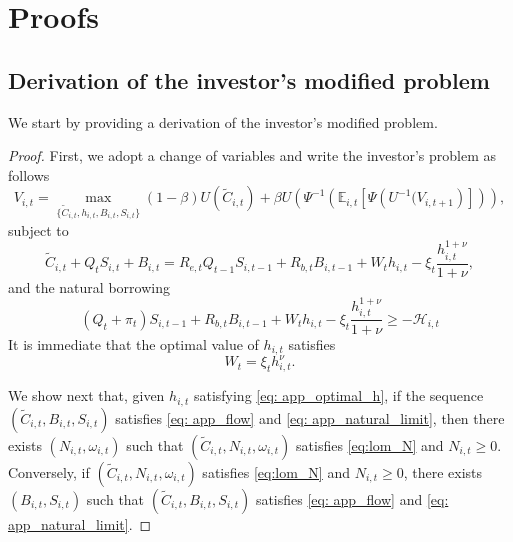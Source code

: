 \section{Proofs}\label{app: proofs}

\subsection{Derivation of the investor's modified problem}\label{app: proof_investor_problem}

We start by providing a derivation of the investor's modified problem. 
\begin{proof}
    First, we adopt a change of variables and write the investor's problem as follows
    \begin{equation}\label{eq: app_investor_problem}
        V_{i,t} = \max_{\{\tilde{C}_{i,t}, h_{i,t}, B_{i,t}, S_{i,t}\}} (1-\beta) U\left(\tilde{C}_{i,t} \right) + \beta U\left( \Psi^ {-1}\left( \mathbb{E}_{i,t}\left[ \Psi\left( U^ {-1}(V_{i,t+1}\right)\right] \right)  \right),
    \end{equation}
    subject to 
    \begin{equation}\label{eq: app_flow}
            \tilde{C}_{i,t} + Q_t S_{i,t} + B_{i,t} = R_{e,t} Q_{t-1} S_{i,t-1} + R_{b,t} B_{i,t-1} + W_t h_{i,t} -\xi_t \frac{h_{i,t}^{1+\nu}}{1+\nu},
    \end{equation}
    and the natural borrowing
    \begin{equation}\label{eq: app_natural_limit}
        (Q_t+\pi_t) S_{i,t-1} + R_{b,t} B_{i,t-1} + W_t h_{i,t} -\xi_t \frac{h_{i,t}^{1+\nu}}{1+\nu} \geq -\mathcal{H}_{i,t}
    \end{equation}
    It is immediate that the optimal value of $h_{i,t}$ satisfies
    \begin{equation}\label{eq: app_optimal_h}
        W_t = \xi_t h_{i,t}^\nu.
    \end{equation}
    
    We show next that, given $h_{i,t}$ satisfying \eqref{eq: app_optimal_h}, if the sequence $(\tilde{C}_{i,t},B_{i,t}, S_{i,t})$ satisfies \eqref{eq: app_flow} and \eqref{eq: app_natural_limit}, then     there exists $(N_{i,t}, \omega_{i,t})$ such that $(\tilde{C}_{i,t}, N_{i,t}, \omega_{i,t}) $ satisfies \eqref{eq:lom_N} and $N_{i,t} \geq 0$. 
    Conversely, if $(\tilde{C}_{i,t}, N_{i,t}, \omega_{i,t}) $ satisfies \eqref{eq:lom_N} and $N_{i,t} \geq 0$, there exists $(B_{i,t}, S_{i,t})$ such that  $(\tilde{C}_{i,t},B_{i,t}, S_{i,t})$         satisfies \eqref{eq: app_flow} and \eqref{eq: app_natural_limit}.
    

\end{proof}
